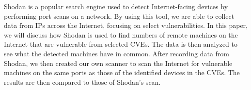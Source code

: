 
Shodan is a popular search engine used to detect Internet-facing devices by performing port scans on a network.
By using this tool, we are able to collect data from IPs across the
Internet, focusing on select vulnerabilities. In this paper, we will
discuss how Shodan is used to find numbers of remote machines on the Internet
that are vulnerable from selected CVEs. The data
is then analyzed to see what the detected machines have in common.
After recording data from Shodan, we then created our own scanner to scan the Internet for vulnerable
machines on the same ports as those of the identified devices in the CVEs.
The results are then compared to those of Shodan's scan.